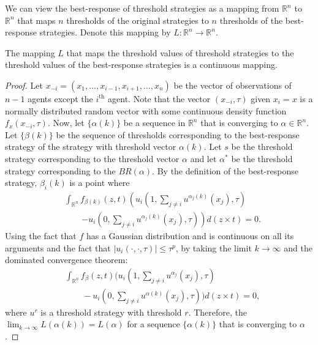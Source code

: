 \documentclass[smallextended]{svjour3}       %
\def\R{\mathbb{R}}    %
\begin{document}
We can view the best-response of threshold strategies as a mapping from $\R^n$ to $\R^n$ that maps $n$ thresholds of the original strategies to $n$ thresholds of the best-response strategies. Denote this mapping by $L:\R^n\to\R^n$.
\begin{lemma}\label{lemma:continuous}
The mapping $L$ that maps the threshold values of threshold strategies to the threshold values of the best-response strategies is a continuous mapping. 
\end{lemma}


\begin{proof}
Let $x_{-i}=(x_1,\ldots,x_{i-1},x_{i+1},\ldots,x_n)$ be the vector of observations of $n-1$ agents except the $i^{\text{th}}$ agent. Note that the vector $(x_{-i},\tau)$ given $x_i=x$ is a normally distributed random vector with some continuous density function $f_{x}(x_{-i},\tau)$. Now, let $\{\alpha(k)\}$ be a sequence in $\R^n$ that is converging to $\alpha\in\R^n$. Let $\{\beta(k)\}$ be the sequence of thresholds corresponding to the best-response strategy of the strategy with threshold vector $\alpha(k)$. Let $s$ be the threshold strategy corresponding to the threshold vector $\alpha$ and let $\alpha^*$ be the threshold strategy corresponding to the $BR(\alpha)$. By the definition of the best-response strategy, $\beta_i(k)$ is a point where 
\begin{align*}
&\int_{\R^{n}}f_{\beta(k)}(z,t)\left(u_i(1,\sum_{j\not=i}u^{\alpha_j(k)}(x_j),\tau)\right.\\
&\qquad\left.-u_i(0,\sum_{j\not=i}u^{\alpha_j(k)}(x_j),\tau)\right)d(z\times t)=0.
\end{align*}
Using the fact that $f$ has a Gaussian distribution and is continuous on all its arguments and the fact that $|u_i(\cdot,\cdot,\tau)|\leq \tau^p$, by taking the limit $k\to\infty$ and the dominated convergence theorem:
\begin{align*}
&\int_{\R^{n}}f_{\beta}(z,t)(u_i(1,\sum_{j\not=i}u^{\alpha_j}(x_j),\tau)\\ 
&\qquad-u_i(0,\sum_{j\not=i}u^{\alpha(k)}(x_j),\tau))d(z\times t)=0,
\end{align*}
where $u^{r}$ is a threshold strategy with threshold $r$. Therefore, the $\lim_{k\to\infty}L(\alpha(k))=L(\alpha)$ for a sequence $\{\alpha(k)\}$ that is converging to $\alpha$.
\end{proof}
\end{document}
